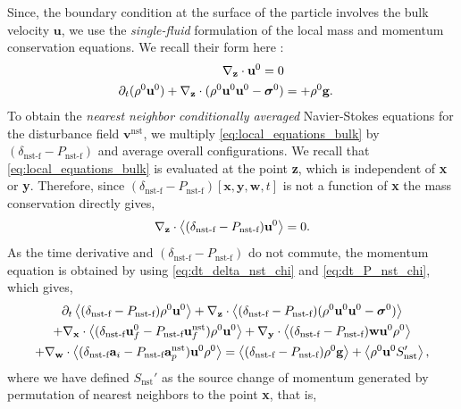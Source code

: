 Since, the boundary condition at the surface of the particle involves the bulk velocity $\textbf{u}$, we use the \textit{single-fluid} formulation of the local mass and momentum conservation equations. 
We recall their form here : 
\begin{align}
    \pddz \cdot \textbf{u}^0 = 0 \\
    \pddt (\rho^0\textbf{u}^0)
    + \pddz\cdot 
    (\rho^0\textbf{u}^0\textbf{u}^0 
    -\bm\sigma^0)
    &= 
    + \rho^0 \textbf{g}. 
    \label{eq:local_equations_bulk}
\end{align}
To obtain the \textit{nearest neighbor conditionally averaged} Navier-Stokes equations for the disturbance field  $\textbf{v}^\text{nst}$, we multiply \ref{eq:local_equations_bulk} by $(\delta_\text{nst-f} - P_\text{nst-f})$ and average overall configurations.
We recall that \ref{eq:local_equations_bulk} is evaluated at the point \textbf{z}, which is independent of \textbf{x} or \textbf{y}. 
Therefore, since $(\delta_\text{nst-f} - P_\text{nst-f})[\textbf{x},\textbf{y},\textbf{w},t]$ is not a function of \textbf{x} the mass conservation directly gives, 
\begin{equation}
    \pddz \cdot \avg{(\delta_\text{nst-f} - P_\text{nst-f}) \textbf{u}^0}
    = 0. 
    \label{eq:mass_nst_d}
\end{equation}
As the time derivative and $(\delta_\text{nst-f} - P_\text{nst-f})$ do not commute, the momentum equation is obtained by using \ref{eq:dt_delta_nst_chi} and \ref{eq:dt_P_nst_chi}, which gives, 
\begin{multline}
    \pddt \avg{(\delta_\text{nst-f} - P_\text{nst-f})\rho^0\textbf{u}^0}
    + \pddz\cdot \avg{ (\delta_\text{nst-f} - P_\text{nst-f}) ( \rho^0  \textbf{u}^0 \textbf{u}^0 - \bm\sigma^0)}\\
    +  \pddx \cdot \avg{(\delta_\text{nst-f} \textbf{u}_f^0 - P_\text{nst-f}\textbf{u}_f^\text{nst}) \rho^0 \textbf{u}^0}
    +  \pddy \cdot \avg{(\delta_\text{nst-f} - P_\text{nst-f}) \textbf{w} \textbf{u}^0 \rho^0}\\
    +  \pddw \cdot \avg{(\delta_\text{nst-f} \textbf{a}_i - P_\text{nst-f} \textbf{a}_p^\text{nst})\textbf{u}^0 \rho^0 }
    = 
     \avg{(\delta_\text{nst-f} - P_\text{nst-f})\rho^0 \textbf{g}} 
    + 
    \avg{\rho^0 \textbf{u}^0 S'_\text{nst} },
    \label{eq:momentum_nst_d}
\end{multline}
where we have defined $S_\text{nst}'$ as the source change of momentum generated by permutation of nearest neighbors to the point \textbf{x}, that is,
